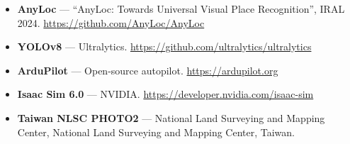 \documentclass[11pt,a4paper]{article}
\begin{document}
\begin{itemize}
  \item \textbf{AnyLoc} --- ``AnyLoc: Towards Universal Visual Place Recognition'', IRAL 2024.
        \url{https://github.com/AnyLoc/AnyLoc}
  \item \textbf{YOLOv8} --- Ultralytics. \url{https://github.com/ultralytics/ultralytics}
  \item \textbf{ArduPilot} --- Open-source autopilot. \url{https://ardupilot.org}
  \item \textbf{Isaac Sim 6.0} --- NVIDIA. \url{https://developer.nvidia.com/isaac-sim}
  \item \textbf{Taiwan NLSC PHOTO2} --- National Land Surveying and Mapping Center, National Land Surveying and Mapping Center, Taiwan.
\end{itemize}
\end{document}
